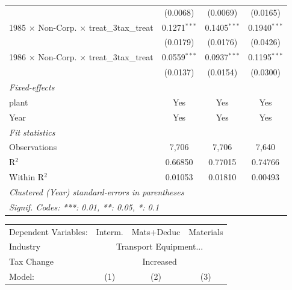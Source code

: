 \documentclass[
  12pt]{article}
\theoremstyle{definition}
\theoremstyle{remark}
\begin{document}
\begin{table}
\begin{minipage}{\linewidth}
\begin{tabular}{lccc}
                                                           & (0.0068)       & (0.0069)       & (0.0165)\\   
   1985 $\times$ Non-Corp. $\times$ treat\_3tax\_treat     & 0.1271$^{***}$ & 0.1405$^{***}$ & 0.1940$^{***}$\\   
                                                           & (0.0179)       & (0.0176)       & (0.0426)\\   
   1986 $\times$ Non-Corp. $\times$ treat\_3tax\_treat     & 0.0559$^{***}$ & 0.0937$^{***}$ & 0.1195$^{***}$\\   
                                                           & (0.0137)       & (0.0154)       & (0.0300)\\   
   \midrule
   \emph{Fixed-effects}\\
   plant                                                   & Yes            & Yes            & Yes\\  
   Year                                                    & Yes            & Yes            & Yes\\  
   \midrule
   \emph{Fit statistics}\\
   Observations                                            & 7,706          & 7,706          & 7,640\\  
   R$^2$                                                   & 0.66850        & 0.77015        & 0.74766\\  
   Within R$^2$                                            & 0.01053        & 0.01810        & 0.00493\\  
   \midrule \midrule
   \multicolumn{4}{l}{\emph{Clustered (Year) standard-errors in parentheses}}\\
   \multicolumn{4}{l}{\emph{Signif. Codes: ***: 0.01, **: 0.05, *: 0.1}}\\
\end{tabular}
\par\endgroup
\begingroup
\centering
\begin{tabular}{lccc}
   \tabularnewline \midrule \midrule
   Dependent Variables:                                    & Interm.        & Mats+Deduc     & Materials\\  
   Industry & \multicolumn{3}{c}{Transport Equipment...} \\ 
   Tax Change & \multicolumn{3}{c}{Increased} \\ 
   Model:                                                  & (1)            & (2)            & (3)\\  

\end{tabular}
\end{minipage}
\end{table}
\end{document}
